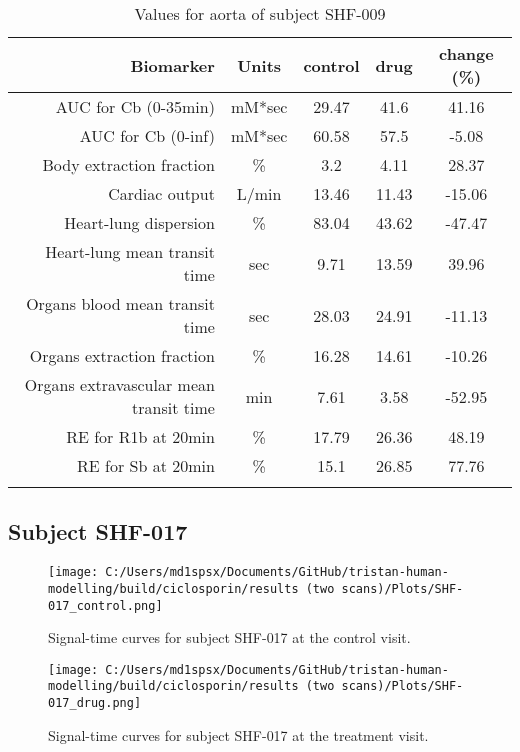 \documentclass{epflreport}%
\begin{document}
\begin{longtable}{rcccc}%
\hline%
Biomarker&Units&control&drug&change (\%)\\%
\hline%
AUC for Cb (0{-}35min)&mM*sec&29.47&41.6&41.16\\%
AUC for Cb (0{-}inf)&mM*sec&60.58&57.5&{-}5.08\\%
Body extraction fraction&\%&3.2&4.11&28.37\\%
Cardiac output&L/min&13.46&11.43&{-}15.06\\%
Heart{-}lung dispersion&\%&83.04&43.62&{-}47.47\\%
Heart{-}lung mean transit time&sec&9.71&13.59&39.96\\%
Organs blood mean transit time&sec&28.03&24.91&{-}11.13\\%
Organs extraction fraction&\%&16.28&14.61&{-}10.26\\%
Organs extravascular mean transit time&min&7.61&3.58&{-}52.95\\%
RE for R1b at 20min&\%&17.79&26.36&48.19\\%
RE for Sb at 20min&\%&15.1&26.85&77.76\\%
\hline%
\caption{Values for aorta of subject SHF-009} \\%
\end{longtable}%
\clearpage%
\subsection{Subject SHF{-}017}%
\label{subsec:SubjectSHF{-}017}%

%


\begin{figure}[h!]%
\centering%
\texttt{[image: C:/Users/md1spsx/Documents/GitHub/tristan-human-modelling/build/ciclosporin/results (two scans)/Plots/SHF-017\_control.png]}%
\caption{Signal{-}time curves for subject SHF{-}017 at the control visit.}%
\end{figure}

%


\begin{figure}[h!]%
\centering%
\texttt{[image: C:/Users/md1spsx/Documents/GitHub/tristan-human-modelling/build/ciclosporin/results (two scans)/Plots/SHF-017\_drug.png]}%
\caption{Signal{-}time curves for subject SHF{-}017 at the treatment visit.}%
\end{figure}
\end{document}
